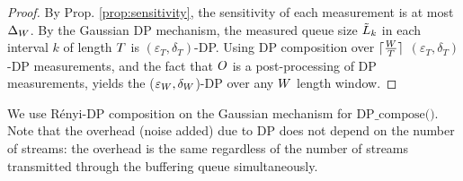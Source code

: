 \begin{proof}
    By Prop. \ref{prop:sensitivity}, the sensitivity of each measurement is at most $\Delta_{W}$.
    By the Gaussian DP mechanism, the measured queue size $\tilde{L}_{k}$ in each interval $k$ of length $T$ is $(\varepsilon_{T}, \delta_{T})$-DP.
    Using DP composition over $\lceil \frac{W}{T} \rceil$ $(\varepsilon_{T}, \delta_{T})$-DP measurements, and the fact that $O$ is a post-processing of DP measurements, yields the ($\varepsilon_{W}, \delta_{W}$)-DP over any $W$ length window.
\end{proof}
We use R\'enyi-DP composition on the Gaussian mechanism for $\textrm{DP\_compose()}$.
Note that the overhead (\ie noise added) due to DP does not depend on the number of streams: the overhead is the same regardless of the number of streams transmitted through the buffering queue simultaneously.


